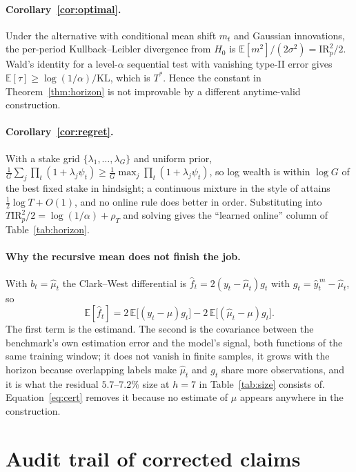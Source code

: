 \documentclass{article}
\theoremstyle{plain}
\theoremstyle{definition}
\begin{document}
\paragraph{Corollary~\ref{cor:optimal}.} Under the alternative with conditional mean shift
$m_t$ and Gaussian innovations, the per-period Kullback--Leibler divergence from $H_0$ is
$\mathbb{E}[m^2]/(2\sigma^2)=\mathrm{IR}_p^2/2$. Wald's identity for a level-$\alpha$
sequential test with vanishing type-II error gives
$\mathbb{E}[\tau]\ge\log(1/\alpha)/\mathrm{KL}$, which is $T^\ast$. Hence the constant in
Theorem~\ref{thm:horizon} is not improvable by a different anytime-valid construction.

\paragraph{Corollary~\ref{cor:regret}.} With a stake grid
$\{\lambda_1,\dots,\lambda_G\}$ and uniform prior, $\tfrac1G\sum_j\prod_t(1+\lambda_j\psi_t)
\ge \tfrac1G\max_j\prod_t(1+\lambda_j\psi_t)$, so log wealth is within $\log G$ of the best
fixed stake in hindsight; a continuous mixture in the style of \citet{cover1991} attains
$\tfrac12\log T+O(1)$, and no online rule does better in order. Substituting into
$T\mathrm{IR}_p^2/2=\log(1/\alpha)+\rho_T$ and solving gives the ``learned online'' column
of Table~\ref{tab:horizon}.

\paragraph{Why the recursive mean does not finish the job.} With $b_t=\hat\mu_t$ the
Clark--West differential is $\hat f_t=2(y_t-\hat\mu_t)g_t$ with $g_t=\hat y^{\,m}_t-\hat\mu_t$,
so
\[
  \mathbb{E}[\hat f_t]
  = 2\,\mathbb{E}\big[(y_t-\mu)g_t\big] - 2\,\mathbb{E}\big[(\hat\mu_t-\mu)g_t\big].
\]
The first term is the estimand. The second is the covariance between the benchmark's own
estimation error and the model's signal, both functions of the same training window; it does
not vanish in finite samples, it grows with the horizon because overlapping labels make
$\hat\mu_t$ and $g_t$ share more observations, and it is what the residual $5.7$--$7.2\%$ size
at $h=7$ in Table~\ref{tab:size} consists of. Equation~\eqref{eq:cert} removes it because no
estimate of $\mu$ appears anywhere in the construction.

\section{Audit trail of corrected claims}
\label{app:audit}
\end{document}
